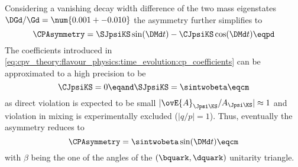Considering a vanishing decay width difference of the two mass eigenstates
$\DGd/\Gd = \num{0.001 +- 0.010}$ \cite{Amhis:2014hma} the \CP asymmetry further
simplifies to
%
\begin{equation}
  \CPAsymmetry = \SJpsiKS\sin(\DMd t) - \CJpsiKS\cos(\DMd t) \eqpd
\end{equation}
%
The \CP coefficients introduced in
\cref{eq:cpv_theory:flavour_physics:time_evolution:cp_coefficients} can be
approximated to a high precision to be
%
\begin{equation}
  \CJpsiKS = 0 \eqand 
  \SJpsiKS = \sintwobeta \eqcm
\end{equation}
%
as direct \CP violation is expected to be small
$\vert\ovE{A}_{\Jpsi\KS}/A_{\Jpsi\KS}\vert\approx 1$ and \CP violation in mixing
is experimentally excluded ($\vert q/p \vert = 1$). Thus, eventually the \CP
asymmetry reduces to
%
\begin{equation}
  \CPAsymmetry = \sintwobeta\sin(\DMd t) \eqcm
\end{equation}
%
with $\beta$ being the one of the angles of the ${(\bquark,\dquark)}$ unitarity
triangle. 

